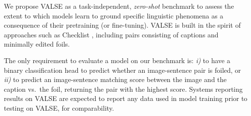 \documentclass[11pt]{article}
\newcommand{\dataset}{VALSE}
\begin{document}
\begin{comment}
         & $acc_r$ & 50.0 & 45.2 & 50.0 & 49.7 & 44.2 & 48.1 & 69.2  &  \\
        \midrule
        \multirow{4}{*}{FOIL it!} & $acc$ & 50.0 & -- & -- & -- & 70.8 & 55.9 & 71.5 & \\
         & $p_c$ & 50.0 & -- & -- & -- & 72.3 & 98.8 & 94.3 & \\ 
         & $p_f$ & 50.0 & -- & -- & -- & 69.3 & 12.9 & 48.8 & \\ 
         & $acc_r$ & 50.0 & 77.5 & 80.7 & 88.8 & 87.1 & 86.9 & 86.9  & \\         
        \bottomrule
    \end{tabular}
    }
    \caption{Results on all \dataset{} instruments and FOIL it!
}
    \label{tab:bench_results}
\end{table*}
\end{comment} We propose \dataset{} as a task-independent, \emph{zero-shot} benchmark to assess the extent to which models learn to ground specific linguistic phenomena as a consequence of their pretraining (or fine-tuning). \dataset{} is built in the spirit of approaches such as Checklist \cite{ribeiro-etal-2020-beyond},
including
pairs consisting of captions and minimally edited foils.


The only requirement to
evaluate a model on our benchmark is:
\textit{i)} to have a binary classification head to predict whether an image-sentence pair is foiled,
or
\textit{ii)} to predict an image-sentence matching score between the image and the caption vs.\ the foil, returning the pair with the highest score. Systems reporting results on \dataset{} are expected to report any data used in model training prior to testing on \dataset{}, for comparability. 
\end{document}
